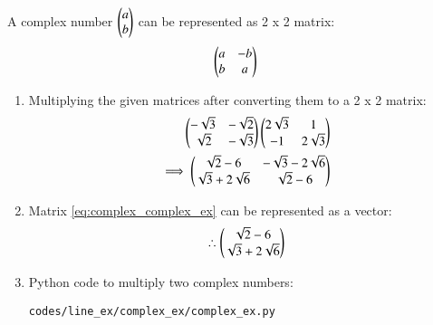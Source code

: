 A complex number $\begin{pmatrix}a\\b\end{pmatrix}$ can be represented as 2 x 2 matrix:
\begin{align}
\begin{pmatrix}a & -b \\ b & a\end{pmatrix}
\end{align}

\begin{enumerate}
\item Multiplying the given matrices after converting them to a 2 x 2 matrix:
\begin{align}
\begin{pmatrix}-\sqrt{3} & -\sqrt{2} \\ \sqrt{2} & -\sqrt{3}\end{pmatrix}\begin{pmatrix}2\sqrt{3} & 1 \\ -1 & 2\sqrt{3}\end{pmatrix}\\
\implies \begin{pmatrix}\sqrt{2} - 6 & -\sqrt{3} - 2\sqrt{6} \\ \sqrt{3} + 2\sqrt{6} & \sqrt{2} - 6\end{pmatrix}\label{eq:complex_complex_ex}
\end{align}

\item Matrix \ref{eq:complex_complex_ex} can be represented as a vector:
\begin{align}
\therefore \begin{pmatrix}\sqrt{2} - 6 \\ \sqrt{3} + 2\sqrt{6}\end{pmatrix}
\end{align}

\item Python code to multiply two complex numbers:
\begin{lstlisting}
codes/line_ex/complex_ex/complex_ex.py
\end{lstlisting}
\end{enumerate}



